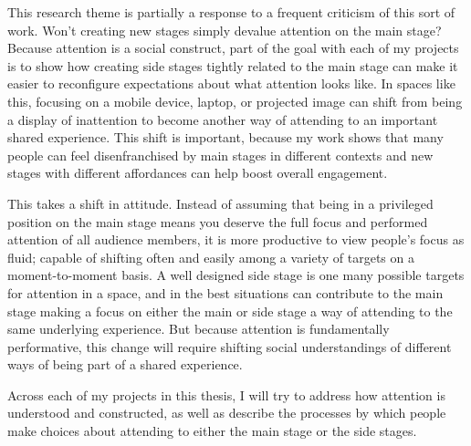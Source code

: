 This research theme is partially a response to a frequent criticism of this sort of work. Won't creating new stages simply devalue attention on the main stage? Because attention is a social construct, part of the goal with each of my projects is to show how creating side stages tightly related to the main stage can make it easier to reconfigure expectations about what attention looks like. In spaces like this, focusing on a mobile device, laptop, or projected image can shift from being a display of inattention to become another way of attending to an important shared experience. This shift is important, because my work shows that many people can feel disenfranchised by main stages in different contexts and new stages with different affordances can help boost overall engagement.

This takes a shift in attitude. Instead of assuming that being in a privileged position on the main stage means you deserve the full focus and performed attention of all audience members, it is more productive to view people's focus as fluid; capable of shifting often and easily among a variety of targets on a moment-to-moment basis. A well designed side stage is one many possible targets for attention in a space, and in the best situations can contribute to the main stage making a focus on either the main or side stage a way of attending to the same underlying experience. But because attention is fundamentally performative, this change will require shifting social understandings of different ways of being part of a shared experience.

Across each of my projects in this thesis, I will try to address how attention is understood and constructed, as well as describe the processes by which people make choices about attending to either the main stage or the side stages.






